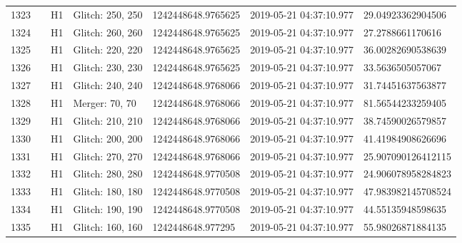 \begin{longtable}{lllllll}
1323 &                                                    &       H1 &  Glitch: 250, 250 &  1242448648.9765625 &  2019-05-21 04:37:10.977 &   29.04923362904506 \\
1324 &                                                    &       H1 &  Glitch: 260, 260 &  1242448648.9765625 &  2019-05-21 04:37:10.977 &    27.2788661170616 \\
1325 &                                                    &       H1 &  Glitch: 220, 220 &  1242448648.9765625 &  2019-05-21 04:37:10.977 &   36.00282690538639 \\
1326 &                                                    &       H1 &  Glitch: 230, 230 &  1242448648.9765625 &  2019-05-21 04:37:10.977 &    33.5636505057067 \\
1327 &                                                    &       H1 &  Glitch: 240, 240 &  1242448648.9768066 &  2019-05-21 04:37:10.977 &   31.74451637563877 \\
1328 &                                                    &       H1 &    Merger: 70, 70 &  1242448648.9768066 &  2019-05-21 04:37:10.977 &   81.56544233259405 \\
1329 &                                                    &       H1 &  Glitch: 210, 210 &  1242448648.9768066 &  2019-05-21 04:37:10.977 &   38.74590026579857 \\
1330 &                                                    &       H1 &  Glitch: 200, 200 &  1242448648.9768066 &  2019-05-21 04:37:10.977 &   41.41984908626696 \\
1331 &                                                    &       H1 &  Glitch: 270, 270 &  1242448648.9768066 &  2019-05-21 04:37:10.977 &  25.907090126412115 \\
1332 &                                                    &       H1 &  Glitch: 280, 280 &  1242448648.9770508 &  2019-05-21 04:37:10.977 &  24.906078958284823 \\
1333 &                                                    &       H1 &  Glitch: 180, 180 &  1242448648.9770508 &  2019-05-21 04:37:10.977 &  47.983982145708524 \\
1334 &                                                    &       H1 &  Glitch: 190, 190 &  1242448648.9770508 &  2019-05-21 04:37:10.977 &   44.55135948598635 \\
1335 &                                                    &       H1 &  Glitch: 160, 160 &   1242448648.977295 &  2019-05-21 04:37:10.977 &   55.98026871884135 \\

\end{longtable}
